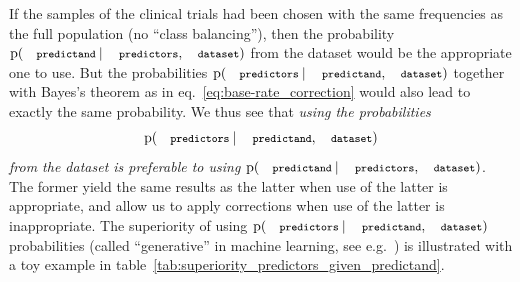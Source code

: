 \documentclass[utf8]{FrontiersinHarvard_mod} %
\newcommand*{\sect}{\S}%
\newcommand*{\eqn}{eq.}%
\newcommand*{\eg}{{e.g.}}
\newcommand*{\p}{\mathrm{p}}%
\renewcommand*{\|}[1][]{\nonscript\:#1\vert\nonscript\:\mathopen{}}
\newcommand*{\predictors}{\texttt{\footnotesize predictors}}
\newcommand*{\predictand}{\texttt{\footnotesize predictand}}
\newcommand*{\dataset}{\texttt{\footnotesize dataset}}
\begin{document}
If the samples of the clinical trials had been chosen with the same frequencies as the full population (no \enquote{class balancing}), then the probability $\p(\predictand \| \predictors, \dataset)$ from the dataset would be the appropriate one to use. But the probabilities $\p(\predictors \| \predictand, \dataset)$ together with Bayes's theorem as in \eqn~\eqref{eq:base-rate_correction} would also lead to exactly the same probability. We thus see that \emph{using the probabilities}
\[\p(\predictors \| \predictand, \dataset)\]
\emph{from the dataset is preferable to using} $\p(\predictand \| \predictors, \dataset)$. The former yield the same results as the latter when use of the latter is appropriate, and allow us to apply corrections when use of the latter is inappropriate. The superiority of using $\p(\predictors \| \predictand, \dataset)$ probabilities (called \enquote{generative} in machine learning, see \eg\ \citealp[\sect\,8.6]{murphy2012}) is illustrated with a toy example in table~\ref{tab:superiority_predictors_given_predictand}.
\end{document}
